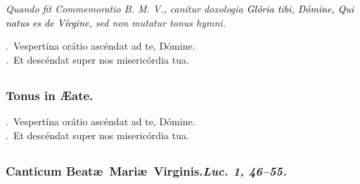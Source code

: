 \documentclass[12pt]{article} %
\newenvironment{rubric}{\vspace{2 mm}\color{benred8} \itshape \leftskip 0in \setlength{\parindent}{0.25in}}{\vspace{2 mm}}
\newenvironment{response}{\leftskip 0in \setlength{\parindent}{0in}}{\vspace{2 mm}}
\let\oldVbar\Vbar
\renewcommand{\Vbar}{\textcolor{benred8}{\oldVbar .}}
\let\oldRbar\Rbar
\renewcommand{\Rbar}{\textcolor{benred8}{\oldRbar .}}
\def\capitulumSpace{\hspace{20 mm}}
\begin{document}
\begin{rubric}
Quando fit Commemoratio B. M. V., canitur doxologia \emph{\textcolor{black}{Gl\'{o}ria tibi, D\'{o}mine, Qui natus es de V\'{i}rgine}}, sed non mutatur tonus hymni.

\end{rubric}

\begin{response}
\Vbar\ Vespert\'{i}na or\'{a}tio asc\'{e}ndat ad te, D\'{o}mine.\\
\Rbar\ Et desc\'{e}ndat super nos miseric\'{o}rdia tua.

\end{response}


\subsection*{}

\subsubsection*{Tonus in \AE {}ate.}


\gresetfirstlineaboveinitial{\small \textsc{ \textbf{\textcolor{benred8}{VIII}}}}{\small \textsc{ \textbf{\textcolor{benred8}{VIII}}}}

\begin{response}
\Vbar\ Vespert\'{i}na or\'{a}tio asc\'{e}ndat ad te, D\'{o}mine.\\
\Rbar\ Et desc\'{e}ndat super nos miseric\'{o}rdia tua.

\end{response}


\subsection*{}

\subsubsection*{Canticum Beat\ae\ Mari\ae\ Virginis.\capitulumSpace \emph{Luc. 1, 46--55.}}

\end{document}
